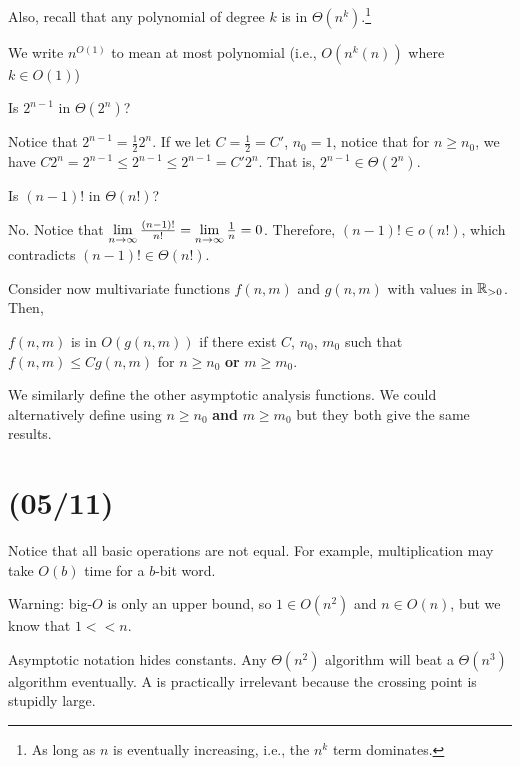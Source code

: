 Also, recall that any polynomial of degree $k$ is in $\Theta(n^k)$.\footnote{As long as $n$ is eventually increasing, i.e., the $n^k$ term dominates.}

We write $n^{O(1)}$ to mean at most polynomial (i.e., $O(n^k(n))$ where $k \in O(1)$)

\begin{xca}
  Is $2^{n-1}$ in $\Theta(2^n)$?
\end{xca}
\begin{prf}
  Notice that $2^{n-1} = \frac12 2^n$.
  If we let $C = \frac12 = C'$, $n_0 = 1$, notice that for $n \geq n_0$,
  we have $C 2^n = 2^{n-1} \leq 2^{n-1} \leq 2^{n-1} = C'2^n$.
  That is, $2^{n-1} \in \Theta(2^n)$.
\end{prf}

\begin{xca}
  Is $(n-1)!$ in $\Theta(n!)$?
\end{xca}
\begin{sol}
  No. Notice that $\lim\limits_{n\to\infty} \frac{(n-1)!}{n!} = \lim\limits_{n\to\infty} \frac1n = 0$.
  Therefore, $(n-1)! \in o(n!)$, which contradicts $(n-1)! \in \Theta(n!)$.
\end{sol}

Consider now multivariate functions $f(n,m)$ and $g(n,m)$
with values in $\mathbb{R}_{>0}$. Then,

\begin{defn*}
  $f(n,m)$ is in $O(g(n,m))$ if there exist $C$, $n_0$, $m_0$
  such that $f(n,m) \leq C g(n,m)$ for $n \geq n_0$ \textbf{or} $m \geq m_0$.
\end{defn*}

We similarly define the other asymptotic analysis functions.
We could alternatively define using $n \geq n_0$ \textbf{and} $m \geq m_0$
but they both give the same results.

\section{(05/11)}

Notice that all basic operations are not equal.
For example, multiplication may take $O(b)$ time for a $b$-bit word.

Warning: big-$O$ is only an upper bound, so $1 \in O(n^2)$ and $n \in O(n)$, but we know that $1 << n$.

Asymptotic notation hides constants.
Any $\Theta(n^2)$ algorithm will beat a $\Theta(n^3)$ algorithm eventually.
A  is practically irrelevant because the crossing point is stupidly large.

